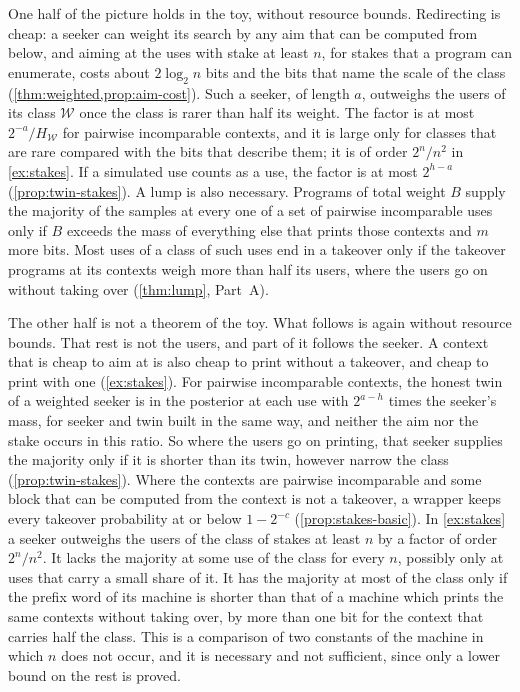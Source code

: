 One half of the picture holds in the toy, without resource bounds. Redirecting is cheap: a seeker can weight
its search by any aim that can be computed from below, and aiming at the uses with stake at least $n$, for
stakes that a program can enumerate, costs about $2\log_2n$ bits and the bits that name the scale of the
class (\cref{thm:weighted,prop:aim-cost}). Such a seeker, of length $a$, outweighs the users of its class
$\mathcal W$ once the class is rarer than half its weight. The factor is at most $2^{-a}/H_{\mathcal W}$ for
pairwise incomparable contexts, and it is large only for classes that are rare compared with the bits that
describe them; it is of order $2^n/n^2$ in \cref{ex:stakes}. If a simulated use counts as a use, the factor
is at most $2^{h-a}$ (\cref{prop:twin-stakes}). A lump is also
necessary. Programs of total weight $B$ supply the majority of the samples at every one of a set of pairwise
incomparable uses only if $B$ exceeds the mass of everything else that prints those contexts and $m$ more
bits. Most uses of a class of such uses end in a takeover only if the takeover programs at its contexts weigh
more than half its users, where the users go on without taking over (\cref{thm:lump}, Part~A).

The other half is not a theorem of the toy. What follows is again without resource bounds. That rest is not
the users, and part of it follows the seeker. A context that is cheap to aim at is also cheap to print
without a takeover, and cheap to print with one (\cref{ex:stakes}). For pairwise incomparable
contexts, the honest twin of a weighted seeker is in the posterior at each use with $2^{a-h}$ times the
seeker's mass, for seeker and twin built in the same way, and neither the aim nor the stake occurs in this
ratio. So where the users go on printing, that seeker supplies the majority only if it is shorter than its
twin, however narrow the class (\cref{prop:twin-stakes}). Where the contexts are pairwise incomparable and
some block that can be computed from the context is not a takeover, a wrapper keeps every takeover
probability at or below $1-2^{-c}$ (\cref{prop:stakes-basic}). In \cref{ex:stakes} a seeker outweighs the
users of the class of stakes at least $n$ by a factor of order $2^n/n^2$. It lacks the majority at some use
of the class for every $n$, possibly only at uses that carry a small share of it. It has the majority at most
of the class only if the prefix word of its machine is shorter than that of a machine which prints the same
contexts without taking over, by more than one bit for the context that carries half the class. This is a
comparison of two
constants of the machine in which $n$ does not occur, and it is necessary and not sufficient, since only a
lower bound on the rest is proved.

